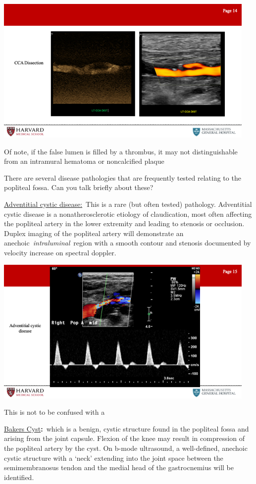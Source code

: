 \documentclass[
]{book}
\begin{document}
\includegraphics[width=5in]{images/vasc_lab/Slide15}

Of note, if the false lumen is filled by a thrombus, it may not
distinguishable from an intramural hematoma or noncalcified plaque

There are several disease pathologies that are frequently tested
relating to the popliteal fossa. Can you talk briefly about these?

\underline{Adventitial cystic disease:}~This is a rare (but often tested)
pathology. Adventitial cystic disease is a nonatherosclerotic etiology
of claudication, most often affecting the popliteal artery in the lower
extremity and leading to stenosis or occlusion. Duplex imaging of the
popliteal artery will demonstrate an anechoic~\emph{intraluminal}~region with
a smooth contour and stenosis documented by velocity increase on
spectral doppler.

\includegraphics[width=5in]{images/vasc_lab/Slide16}

This is not to be confused with a

\underline{Bakers Cyst}\textbf{:}~which is a benign, cystic structure found in the
popliteal fossa and arising from the joint capsule. Flexion of the knee
may result in compression of the popliteal artery by the cyst. On b-mode
ultrasound, a well-defined, anechoic~ cystic structure with a `neck'
extending into the joint space between the semimembranosus tendon and
the medial head of the gastrocnemius will be identified.
\end{document}
